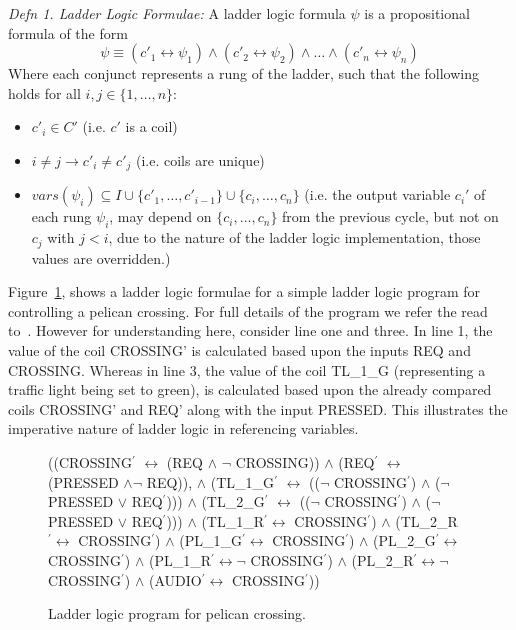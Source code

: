 \documentclass[runningheads]{llncs}
\begin{document}
\textit{Defn 1. Ladder Logic Formulae:}
A ladder logic formula $\psi$ is a propositional formula of the form
$$\psi \equiv (c'_1 \leftrightarrow \psi_1) \wedge (c'_2 \leftrightarrow
\psi_2) \wedge  \ldots \wedge (c'_n \leftrightarrow \psi_n)$$ 
Where each conjunct represents a rung of the ladder,
such that the following holds for all $i,j\in \{1,\ldots,n\}$:
\begin{itemize}
	\item $c'_i \in C'$ (i.e. $c'$ is a coil)
	\item $i \neq j \rightarrow c'_i \neq c'_j$ (i.e. coils are unique)
	\item $vars(\psi_i) \subseteq I \cup  \{c'_1, \ldots, c'_{i-1} \} \cup \{ c_i, \ldots , c_n \}$ (i.e. the output variable $c_i'$ of  each rung $\psi_i$, may depend on  $\{ c_i, \ldots , c_n \}$ from the previous cycle, 
	but not on $c_j$ with $j<i$, due to the nature of the ladder logic implementation,
	those values are overridden.)
\end{itemize}
Figure~\ref{fig:algorithm_1}, shows a ladder logic formulae for a simple ladder logic program for controlling a pelican crossing. For full details of the program we refer the read to~\cite{james2013verification}. However for understanding here, consider line one and three. In line 1, the value of the coil CROSSING’ is calculated based upon the inputs REQ and CROSSING. Whereas in line 3, the value of the coil TL\_1\_G (representing a traffic light being set to green), is calculated based upon the already compared coils CROSSING’ and REQ’ along with the input PRESSED. This illustrates the imperative nature of ladder logic in referencing variables.


\begin{figure}[!h]
	\begin{small}
		\begin{algorithmic}
			\State ((CROSSING$^\prime$  $\leftrightarrow$ (REQ $\land$ $\lnot$ CROSSING)) $\land$ 
			\State (REQ$^\prime$  $\leftrightarrow$ (PRESSED $\land \lnot$ REQ)), $\land$ 
			\State (TL\_1\_G$^\prime$  $\leftrightarrow$ (($\lnot$ CROSSING$^\prime$) $\land$ ($\lnot$ PRESSED $\lor$ REQ$^\prime$))) $\land$
			\State (TL\_2\_G$^\prime$  $\leftrightarrow$ (($\lnot$ CROSSING$^\prime$) $\land$ ($\lnot$ PRESSED $\lor$ REQ$^\prime$))) $\land$ 
			\State (TL\_1\_R$^\prime  \leftrightarrow$ CROSSING$^\prime$) $\land$
			\State (TL\_2\_R$^\prime  \leftrightarrow$ CROSSING$^\prime$) $\land$
			\State (PL\_1\_G$^\prime  \leftrightarrow$ CROSSING$^\prime$) $\land$
			\State (PL\_2\_G$^\prime  \leftrightarrow$ CROSSING$^\prime$) $\land$
			\State (PL\_1\_R$^\prime  \leftrightarrow \lnot$ CROSSING$^\prime$) $\land$
			\State (PL\_2\_R$^\prime  \leftrightarrow \lnot$ CROSSING$^\prime$) $\land$
			\State (AUDIO$^\prime  \leftrightarrow$ CROSSING$^\prime$))
		\end{algorithmic}
	\end{small}
	\caption{Ladder logic program for pelican crossing.}
	\label{fig:algorithm_1}
\end{figure}
\end{document}
